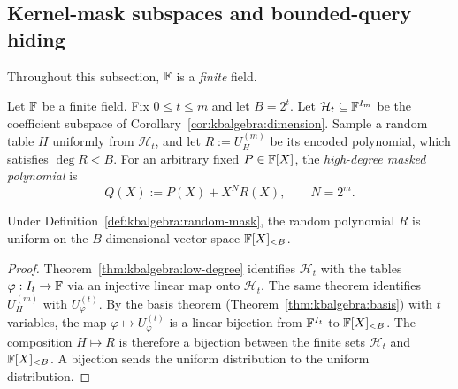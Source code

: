 \subsection{Kernel-mask subspaces and bounded-query hiding}\label{sec:kbalgebra:maskquery}
Throughout this subsection, $\mathbb{F}$ is a \emph{finite} field.

\begin{definition}\label{def:kbalgebra:random-mask}
Let $\mathbb{F}$ be a finite field. Fix $0\leq t\leq m$ and let $B=2^t$. Let $\mathcal H_t\subseteq\mathbb{F}^{I_m}$ be the coefficient subspace of Corollary~\ref{cor:kbalgebra:dimension}. Sample a random table $H$ uniformly from $\mathcal H_t$, and let $R:=U_H^{(m)}$ be its encoded polynomial, which satisfies $\deg R<B$. For an arbitrary fixed $P\in\mathbb{F}[X]$, the 
\emph{high-degree masked polynomial} is
\[
 Q(X):=P(X)+X^N R(X),\qquad N=2^m.
\]
\end{definition}

\begin{lemma}\label{lem:kbalgebra:uniform-polynomial}
Under Definition~\ref{def:kbalgebra:random-mask}, the random polynomial $R$ is uniform on the $B$-dimensional vector space $\mathbb{F}[X]_{<B}$.
\end{lemma}
\begin{proof}
Theorem~\ref{thm:kbalgebra:low-degree} identifies $\mathcal H_t$ with the tables $\varphi:I_t\to\mathbb{F}$ via an injective linear map onto $\mathcal H_t$. The same theorem identifies $U_H^{(m)}$ with $U_\varphi^{(t)}$. By the basis theorem (Theorem~\ref{thm:kbalgebra:basis}) with $t$ variables, the map $\varphi\mapsto U_\varphi^{(t)}$ is a linear bijection from $\mathbb{F}^{I_t}$ to $\mathbb{F}[X]_{<B}$. The composition $H\mapsto R$ is therefore a bijection between the finite sets $\mathcal H_t$ and $\mathbb{F}[X]_{<B}$. A bijection sends the uniform distribution to the uniform distribution.
\end{proof}

